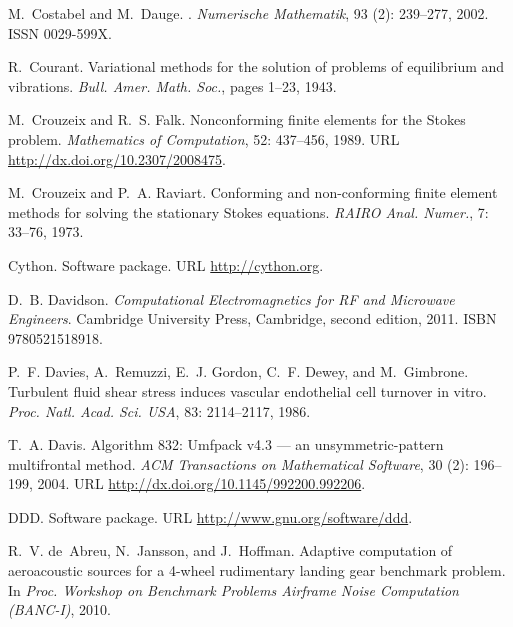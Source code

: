\begin{thebibliography}{467}
M.~Costabel and M.~Dauge.
.
\newblock \emph{Numerische Mathematik}, 93 (2): 239--277,
  2002.
\newblock ISSN 0029-599X.

R.~Courant.
\newblock Variational methods for the solution of problems of equilibrium and
  vibrations.
\newblock \emph{Bull. Amer. Math. Soc.}, pages 1--23, 1943.

M.~Crouzeix and R.~S. Falk.
\newblock Nonconforming finite elements for the {S}tokes problem.
\newblock \emph{Mathematics of Computation}, 52: 437--456, 1989.
\newblock URL \url{http://dx.doi.org/10.2307/2008475}.

M.~Crouzeix and P.~A. Raviart.
\newblock Conforming and non-conforming finite element methods for solving the
  stationary {S}tokes equations.
\newblock \emph{RAIRO Anal. Numer.}, 7: 33--76, 1973.

Cython.
\newblock Software package.
\newblock URL \url{http://cython.org}.

D.~B. Davidson.
\newblock \emph{Computational Electromagnetics for RF and Microwave Engineers}.
\newblock Cambridge University Press, Cambridge, second edition, 2011.
\newblock ISBN 9780521518918.

P.~F. Davies, A.~Remuzzi, E.~J. Gordon, C.~F. Dewey, and M.~Gimbrone.
\newblock Turbulent fluid shear stress induces vascular endothelial cell
  turnover in vitro.
\newblock \emph{Proc. Natl. Acad. Sci. USA}, 83: 2114--2117, 1986.

T.~A. Davis.
\newblock Algorithm 832: Umfpack v4.3 --- an unsymmetric-pattern multifrontal
  method.
\newblock \emph{ACM Transactions on Mathematical Software}, 30
  (2): 196--199, 2004.
\newblock URL \url{http://dx.doi.org/10.1145/992200.992206}.

DDD.
\newblock Software package.
\newblock URL \url{http://www.gnu.org/software/ddd}.

R.~V. de~Abreu, N.~Jansson, and J.~Hoffman.
\newblock Adaptive computation of aeroacoustic sources for a 4-wheel
  rudimentary landing gear benchmark problem.
\newblock In \emph{Proc. Workshop on Benchmark Problems Airframe Noise
  Computation (BANC-I)}, 2010.


\end{thebibliography}
